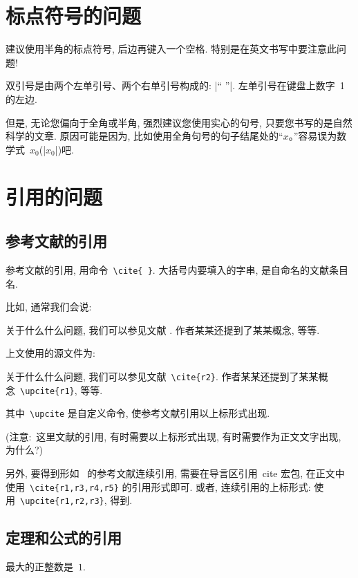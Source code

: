 \documentclass{whuBSthesis}%
\begin{document}
\section{标点符号的问题}

建议使用半角的标点符号, 后边再键入一个空格. 特别是在英文书写中要注意此问题!

双引号是由两个左单引号、两个右单引号构成的: \everb|``  ''|. 左单引号在键盘上数字~1 的左边.

但是, 无论您偏向于全角或半角, 强烈建议您使用实心的句号, 只要您书写的是自然科学的文章.
原因可能是因为, 比如使用全角句号的句子结尾处的``$x$。''容易误为数学式~$x_0$(\everb|$x_0$|)吧.



\section{引用的问题}


\subsection{参考文献的引用}

参考文献的引用, 用命令~\verb|\cite{ }|. 大括号内要填入的字串, 是自命名的文献条目名.

比如, 通常我们会说:
\begin{colorboxed}
关于什么什么问题, 我们可以参见文献 \cite{r2}. 作者某某还提到了某某概念, 等等.
\end{colorboxed}
上文使用的源文件为:
\begin{colorboxed}
关于什么什么问题, 我们可以参见文献~\verb|\cite{r2}|. 作者某某还提到了某某概念~\verb|\upcite{r1}|, 等等.
\end{colorboxed}
其中~\verb|\upcite| 是自定义命令, 使参考文献引用以上标形式出现.

({\heiti 注意:}~{\kaishu 这里文献的引用, 有时需要以上标形式出现, 有时需要作为正文文字出现, 为什么?})

另外, 要得到形如~\cite{r1,r3,r4,r5} 的参考文献连续引用, 需要在导言区引用~cite 宏包,
在正文中使用~\verb|\cite{r1,r3,r4,r5}| 的引用形式即可.
或者, 连续引用的上标形式: 使用~\verb|\upcite{r1,r2,r3}|, 得到.

\subsection{定理和公式的引用}

\begin{theorem}[谁发现的]\label{th-abcd}
最大的正整数是~$1$.
\end{theorem}
\end{document}
